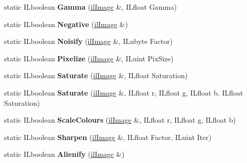 \begin{DoxyCompactItemize}
\item 
\mbox{\label{classilFilters_a22185bfef64a30e2661017e18582b1cb}} 
static I\+Lboolean {\bfseries Gamma} (\hyperlink{classilImage}{il\+Image} \&, I\+Lfloat Gamma)
\item 
\mbox{\label{classilFilters_a9f24b106a82246e0beb3c99f176edc44}} 
static I\+Lboolean {\bfseries Negative} (\hyperlink{classilImage}{il\+Image} \&)
\item 
\mbox{\label{classilFilters_a947d90cee30b4a1f63d355870abfc860}} 
static I\+Lboolean {\bfseries Noisify} (\hyperlink{classilImage}{il\+Image} \&, I\+Lubyte Factor)
\item 
\mbox{\label{classilFilters_a72a597e07f9b287d19982f5c393444e3}} 
static I\+Lboolean {\bfseries Pixelize} (\hyperlink{classilImage}{il\+Image} \&, I\+Luint Pix\+Size)
\item 
\mbox{\label{classilFilters_aa116c050eb7420b8555f9be87a98287a}} 
static I\+Lboolean {\bfseries Saturate} (\hyperlink{classilImage}{il\+Image} \&, I\+Lfloat Saturation)
\item 
\mbox{\label{classilFilters_aa7d8deaab6bdf5f5b542962b5bb4c5e3}} 
static I\+Lboolean {\bfseries Saturate} (\hyperlink{classilImage}{il\+Image} \&, I\+Lfloat r, I\+Lfloat g, I\+Lfloat b, I\+Lfloat Saturation)
\item 
\mbox{\label{classilFilters_a9e2ab2c2d207456ffca24741fafd9bfc}} 
static I\+Lboolean {\bfseries Scale\+Colours} (\hyperlink{classilImage}{il\+Image} \&, I\+Lfloat r, I\+Lfloat g, I\+Lfloat b)
\item 
\mbox{\label{classilFilters_a582099d7d24332f00fd426dbe53c4178}} 
static I\+Lboolean {\bfseries Sharpen} (\hyperlink{classilImage}{il\+Image} \&, I\+Lfloat Factor, I\+Luint Iter)
\item 
\mbox{\label{classilFilters_ad885b4677507b4bf53ddb24d500b2901}} 
static I\+Lboolean {\bfseries Alienify} (\hyperlink{classilImage}{il\+Image} \&)
\item 
\mbox{\label{classilFilters_a00d7a6ad191c8ea5418e038b19aed632}} 

\end{DoxyCompactItemize}
